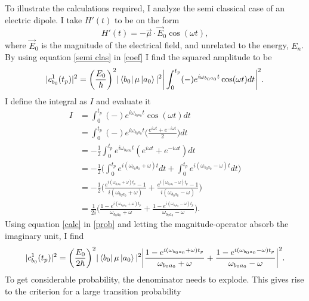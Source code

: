\begin{example}
	\label{electric dipole}
	To illustrate the calculations required, I analyze the semi classical case of an electric dipole. I take $H'(t)$ to be on the form
	\begin{equation}
		H'(t)=-\vec{\mu}\cdot\vec{E}_0\cos(\omega t),
		\label{semi clas}
	\end{equation} 
	where $\vec{E}_0$ is the magnitude of the electrical field, and unrelated to the energy, $E_n$. By using equation \eqref{semi clas} in \eqref{coef} I find the squared amplitude to be
	\begin{equation}
		|c^1_{b_0}(t_p)|^2=\bigg(\frac{E_0}{\hbar}\bigg)^2|\bra{b_0}\mu\ket{a_0}|^2\bigg|\int_{0}^{t_p}(-)e^{i\omega_{b_0a_0}t}\cos(\omega t)dt\bigg|^2.
		\label{prob}
	\end{equation} 
	I define the integral as $I$ and evaluate it
	\begin{equation}
		\begin{split}
			I
			&=\int_{0}^{t_p}(-)e^{i\omega_{b_0a_0}t}\cos(\omega t)dt\\
			&=\int_{0}^{t_p}(-)e^{i\omega_{b_0a_0}t}\bigg(\frac{e^{i\omega t}+e^{-i\omega t}}{2}\bigg)dt\\
			&=-\frac{1}{2}\int_{0}^{t_p}e^{i\omega_{b_0a_0}t}(e^{i\omega t}+e^{-i\omega t})dt\\
			&=-\frac{1}{2}\bigg(\int_{0}^{t_p}e^{i(\omega_{b_0a_0}+\omega)t}dt+\int_{0}^{t_p}e^{i(\omega_{b_0a_0}-\omega)t}dt\bigg)\\
			&=-\frac{1}{2}\bigg(\frac{e^{i(\omega_{b_0a_0}+\omega)t_p}-1}{i(\omega_{b_0a_0}+\omega)}+\frac{e^{i(\omega_{b_0a_0}-\omega)t_p}-1}{i(\omega_{b_0a_0}-\omega)}\bigg)\\
			&=\frac{1}{2i}\bigg(\frac{1-e^{i(\omega_{b_0a_0}+\omega)t_p}}{\omega_{b_0a_0}+\omega}+\frac{1-e^{i(\omega_{b_0a_0}-\omega)t_p}}{\omega_{b_0a_0}-\omega}\bigg).
		\end{split}
		\label{calc}
	\end{equation} 
	Using equation \eqref{calc} in \ref{prob} and letting the magnitude-operator absorb the imaginary unit, I find
	\begin{equation}
		|c^1_{b_0}(t_p)|^2=\bigg(\frac{E_0}{2\hbar}\bigg)^2|\bra{b_0}\mu\ket{a_0}|^2\bigg|\frac{1-e^{i(\omega_{b_0a_0}+\omega)t_p}}{\omega_{b_0a_0}+\omega}+\frac{1-e^{i(\omega_{b_0a_0}-\omega)t_p}}{\omega_{b_0a_0}-\omega}\bigg|^2.
	\end{equation} 
	To get considerable probability, the denominator needs to explode. This gives rise to the criterion for a large transition probability

\end{example}
